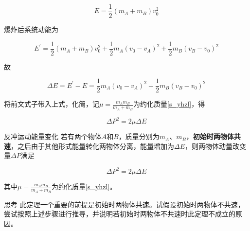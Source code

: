 $$E = \frac{1}{2} (m_A + m_B) v_0^2$$

爆炸后系统动能为

$$E^{\prime} = \frac{1}{2} (m_A + m_B) v_0^2 + \frac{1}{2} m_A (v_0 - v_A)^2 + \frac{1}{2} m_B (v_B - v_0)^2$$

故

$$\Delta E = E^{\prime} - E = \frac{1}{2} m_A (v_0 - v_A)^2 + \frac{1}{2} m_B (v_B - v_0)^2$$

将前文式子带入上式，化简，记$\mu = \frac{m_A m_B}{m_A + m_B}$为约化质量\eqref{s_yhzl}，得

$$\Delta P^2 = 2 \mu \Delta E$$

\begin{theo}{反冲运动能量变化}{}
若有两个物体$A$和$B$，质量分别为$m_A$、$m_B$，\textbf{初始时两物体共速}，之后由于其他形式能量转化两物体分离，能量增加为$\Delta E$，则两物体动量改变量$\Delta P$满足

$$\Delta P^2 = 2 \mu \Delta E$$

其中$\mu = \frac{m_A m_B}{m_A + m_B}$为约化质量\eqref{s_yhzl}。
\end{theo}

\begin{mk}{思考}{}
此定理一个重要的前提是初始时两物体共速。试假设初始时两物体不共速，尝试按照上述步骤进行推导，并说明若初始时两物体不共速时此定理不成立的原因。
\end{mk}